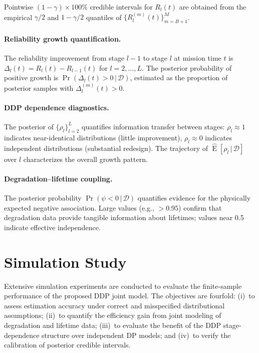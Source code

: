 \documentclass[a4paper,fleqn,longmktitle]{cas-sc}
\DeclareMathOperator{\E}{E}
\newcommand{\given}{\,|\,}
\begin{document}
Pointwise $(1 - \gamma) \times 100\%$ credible intervals for $R_l(t)$ are obtained from the empirical $\gamma/2$ and $1 - \gamma/2$ quantiles of $\{R_l^{(m)}(t)\}_{m=B+1}^{M}$.

\paragraph{Reliability growth quantification.} The reliability improvement from stage $l-1$ to stage $l$ at mission time $t$ is $\Delta_l(t) = R_l(t) - R_{l-1}(t)$ for $l = 2, \ldots, L$. The posterior probability of positive growth is $\Pr(\Delta_l(t) > 0 \given \mathcal{D})$, estimated as the proportion of posterior samples with $\Delta_l^{(m)}(t) > 0$.

\paragraph{DDP dependence diagnostics.} The posterior of $\{\rho_l\}_{l=2}^{L}$ quantifies information transfer between stages: $\rho_l \approx 1$ indicates near-identical distributions (little improvement), $\rho_l \approx 0$ indicates independent distributions (substantial redesign). The trajectory of $\widehat{\E}[\rho_l \given \mathcal{D}]$ over $l$ characterizes the overall growth pattern.

\paragraph{Degradation--lifetime coupling.} The posterior probability $\Pr(\psi < 0 \given \mathcal{D})$ quantifies evidence for the physically expected negative association. Large values (e.g., $> 0.95$) confirm that degradation data provide tangible information about lifetimes; values near 0.5 indicate effective independence.
\section{Simulation Study}
\label{sec:sim}

Extensive simulation experiments are conducted to evaluate the finite-sample performance of the proposed DDP joint model. The objectives are fourfold: (i)~to assess estimation accuracy under correct and misspecified distributional assumptions; (ii)~to quantify the efficiency gain from joint modeling of degradation and lifetime data; (iii)~to evaluate the benefit of the DDP stage-dependence structure over independent DP models; and (iv)~to verify the calibration of posterior credible intervals.
\end{document}
